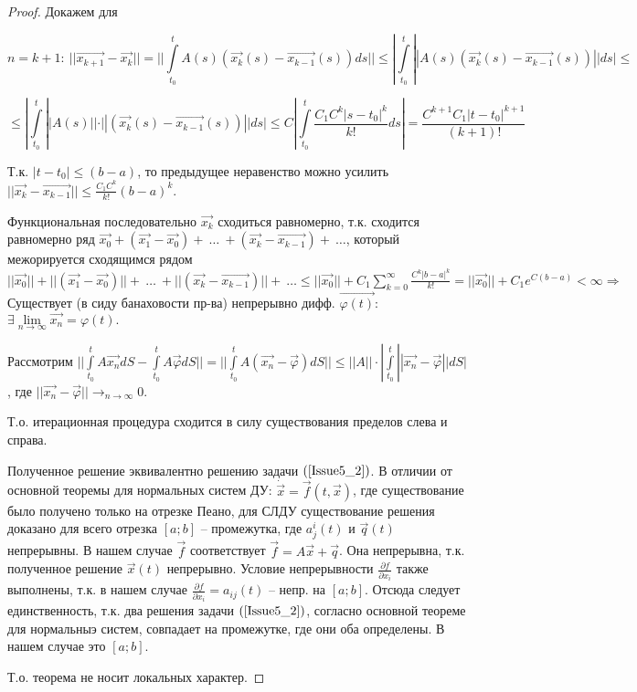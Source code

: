 \begin{proof}
Докажем для 

\[n = k + 1:\  ||\overrightarrow{x_{k+1}} - \overrightarrow{x_{k}}|| = || \int\limits_{t_0}^{t} A(s)(\overrightarrow{x_k}(s) - \overrightarrow{x_{k-1}}(s))ds || \leqslant | \int\limits_{t_0}^{t} ||A(s)(\overrightarrow{x_k}(s) - \overrightarrow{x_{k-1}}(s))|| ds | \leqslant \]

\[ \leqslant | \int\limits_{t_0}^{t} ||A(s)||\cdot ||(\overrightarrow{x_k}(s) - \overrightarrow{x_{k-1}}(s))|| ds | \leqslant C |\int\limits_{t_0}^{t} \frac{C_1C^k|s-t_0|^k}{k!}ds | = \frac{C^{k+1}C_1|t-t_0|^{k+1}}{(k+1)!} \]

Т.к. $|t-t_0| \leqslant (b-a)$, то предыдущее неравенство можно усилить $||\overrightarrow{x_k} - \overrightarrow{x_{k-1}}|| \leqslant \frac{C_1C^k}{k!}(b-a)^k.$

Функциональная последовательно $\overrightarrow{x_k}$ сходиться равномерно, т.к. сходится равномерно ряд $\overrightarrow{x_0} + (\overrightarrow{x_1} - \overrightarrow{x_0}) +\ \dots\ +(\overrightarrow{x_k} - \overrightarrow{x_{k-1}}) +\ \dots$, который межорируется сходящимся рядом $||\overrightarrow{x_0}|| + ||(\overrightarrow{x_1} - \overrightarrow{x_0})|| +\ \dots\ + ||(\overrightarrow{x_k} - \overrightarrow{x_{k-1}})|| +\ \dots \leqslant ||\overrightarrow{x_0}|| + C_1\sum\limits_{k = 0}^{\infty}\frac{C^k|b-a|^k}{k!} = ||\overrightarrow{x_0}|| + C_1 e^{C(b-a)} < \infty \Rightarrow$ Существует (в сиду банаховости пр-ва) непрерывно дифф. $\overrightarrow{\varphi(t)}:$ $\exists \lim\limits_{n \rightarrow \infty} \overrightarrow{x_n} = \varphi(t).$

Рассмотрим $|| \int\limits_{t_0}^{t} A\overrightarrow{x_n}dS - \int\limits_{t_0}^{t} A\overrightarrow{\varphi} dS || = || \int\limits_{t_0}^{t} A(\overrightarrow{x_n} - \overrightarrow{\varphi})dS || \leqslant ||A||\cdot | \int\limits_{t_0}^{t} ||\overrightarrow{x_n} - \overrightarrow{\varphi}|| dS | $, где $||\overrightarrow{x_n} - \overrightarrow{\varphi} || \rightarrow_{n\rightarrow \infty} 0.$

Т.о. итерационная процедура сходится в силу существования пределов слева и справа.

Полученное решение эквивалентно решению задачи $(\ref{Issue5_2})$. В отличии от основной теоремы для нормальных систем ДУ: $\dot{\overrightarrow{x}} = \overrightarrow{f}(t, \overrightarrow{x})$, где существование было получено только на отрезке Пеано, для СЛДУ существование решения доказано для всего отрезка $[a;b]$ -- промежутка, где $a_j^i(t)$ и $\overrightarrow{q}(t)$ непрерывны. В нашем случае $\overrightarrow{f}$ соответствует $\overrightarrow{f} = A\overrightarrow{x} + \overrightarrow{q}$. Она непрерывна, т.к. полученное решение $\overrightarrow{x}(t)$ непрерывно. Условие непрерывности $\frac{\partial f}{\partial x_i}$ также выполнены, т.к. в нашем случае $\frac{\partial f}{\partial x_i} = a_{ij}(t)$ -- непр. на $[a;b]$. Отсюда следует единственность, т.к. два решения задачи $(\ref{Issue5_2})$, согласно основной теореме для нормальныэ систем, совпадает на промежутке, где они оба определены. В нашем случае это $[a;b]$.

Т.о. теорема не носит локальных характер.

\end{proof}
